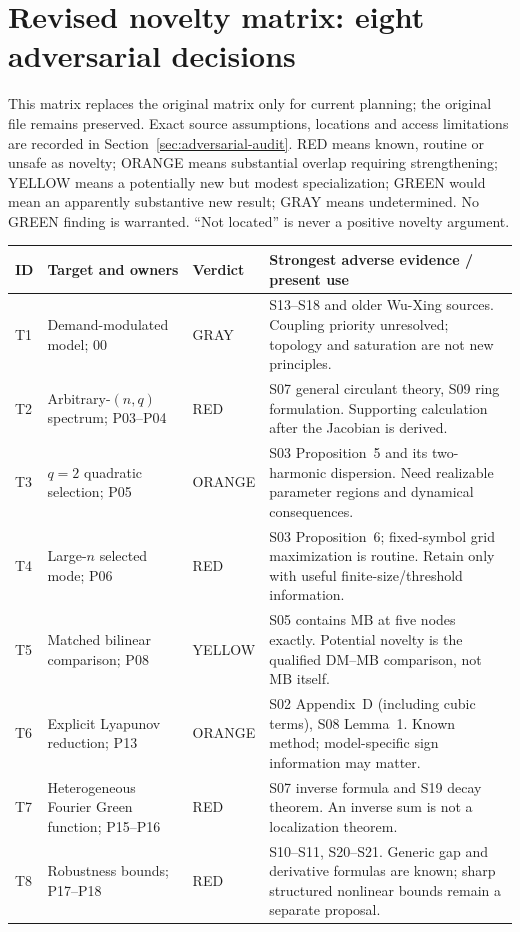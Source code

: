 \section{Revised novelty matrix: eight adversarial decisions}
\label{sec:revised-matrix}
This matrix replaces the original matrix only for current planning; the
original file remains preserved. Exact source assumptions, locations and
access limitations are recorded in Section~\ref{sec:adversarial-audit}.
RED means known, routine or unsafe as novelty; ORANGE means substantial
overlap requiring strengthening; YELLOW means a potentially new but modest
specialization; GREEN would mean an apparently substantive new result;
GRAY means undetermined. No GREEN finding is warranted. ``Not located''
is never a positive novelty argument.

\begin{longtable}{@{}>{\raggedright\arraybackslash}p{}>{\raggedright\arraybackslash}p{}>{\raggedright\arraybackslash}p{}>{\raggedright\arraybackslash}p{}@{}}
\toprule
ID & Target and owners & Verdict & Strongest adverse evidence / present use\\
\midrule\endhead
T1 & Demand-modulated model; 00 & GRAY & S13--S18 and older Wu-Xing sources. Coupling priority unresolved; topology and saturation are not new principles.\\
T2 & Arbitrary-$(n,q)$ spectrum; P03--P04 & RED & S07 general circulant theory, S09 ring formulation. Supporting calculation after the Jacobian is derived.\\
T3 & $q=2$ quadratic selection; P05 & ORANGE & S03 Proposition~5 and its two-harmonic dispersion. Need realizable parameter regions and dynamical consequences.\\
T4 & Large-$n$ selected mode; P06 & RED & S03 Proposition~6; fixed-symbol grid maximization is routine. Retain only with useful finite-size/threshold information.\\
T5 & Matched bilinear comparison; P08 & YELLOW & S05 contains MB at five nodes exactly. Potential novelty is the qualified DM--MB comparison, not MB itself.\\
T6 & Explicit Lyapunov reduction; P13 & ORANGE & S02 Appendix~D (including cubic terms), S08 Lemma~1. Known method; model-specific sign information may matter.\\
T7 & Heterogeneous Fourier Green function; P15--P16 & RED & S07 inverse formula and S19 decay theorem. An inverse sum is not a localization theorem.\\
T8 & Robustness bounds; P17--P18 & RED & S10--S11, S20--S21. Generic gap and derivative formulas are known; sharp structured nonlinear bounds remain a separate proposal.\\
\bottomrule
\end{longtable}

